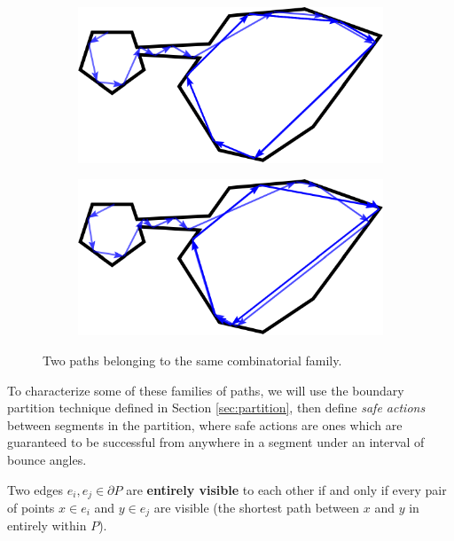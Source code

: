 \documentclass[]{styles/svproc}  %
\begin{document}
\begin{figure}
\centering
\begin{subfigure}{0.5\textwidth}
\includegraphics[width=\linewidth]{figures/twoc_a}
\end{subfigure}%
\begin{subfigure}{0.5\textwidth}
\includegraphics[width=\linewidth]{figures/twoc_b}
\end{subfigure}
\caption{Two paths belonging to the same combinatorial family.}
\label{fig:twopaths}
\end{figure}

To characterize some of these families of paths, we will use the boundary
partition technique defined in Section \ref{sec:partition}, then define
\emph{safe actions} between segments in the partition, where safe actions are
ones which are guaranteed to be successful from anywhere in a segment under an
interval of bounce angles.

\begin{definition}
Two edges $e_i,e_j \in \partial P$ are \textbf{entirely visible} to each other if
and only if every pair of points $x \in e_i$ and $y \in e_j$ are visible (the
shortest path between $x$ and $y$ in entirely within $P$).
\end{definition}
\end{document}
